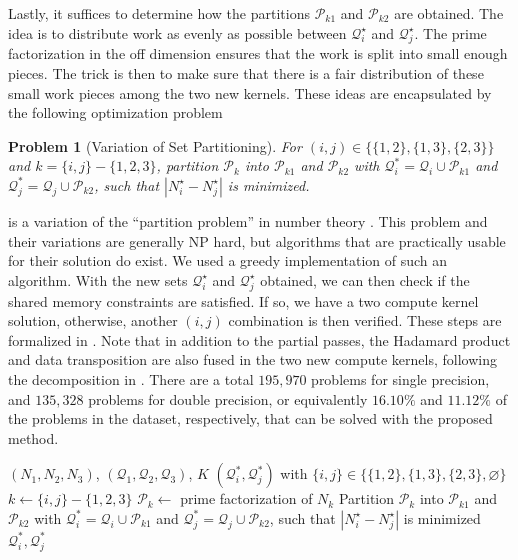 \documentclass[11pt, onecolumn, journal,compsoc]{IEEEtran}
\theoremstyle{problemstyle}
\newtheorem{problem}{Problem}%
\begin{document}
Lastly, it suffices to determine how the partitions $\mathcal{P}_{k1}$ and $\mathcal{P}_{k2}$ are obtained. The idea is to distribute work as evenly as possible between $\mathcal{Q}_i^\star$ and $\mathcal{Q}_j^\star$. The prime factorization in the off dimension ensures that the work is split into small enough pieces. The trick is then to make sure that there is a fair distribution of these small work pieces among the two new kernels. These ideas are encapsulated by the following optimization problem
\begin{problem}[Variation of Set Partitioning]
For $(i,j) \in \bigl \{ \{1,2\}, \{1,3\}, \{2,3\} \bigr \}$ and $k = \{i,j\} - \{1,2,3\}$, partition $\mathcal{P}_k$ into $\mathcal{P}_{k1}$ and $\mathcal{P}_{k2}$ with $\mathcal{Q}_i^* = \mathcal{Q}_i \cup \mathcal{P}_{k1}$ and $\mathcal{Q}_j^* = \mathcal{Q}_j \cup \mathcal{P}_{k2}$, such that $| N_i^\star - N_j^\star |$ is minimized.
\label{prob:set_partitioning}
\end{problem}
 is a variation of the ``partition problem'' in number theory \cite{mertens03}. This problem and their variations are generally NP hard, but algorithms that are practically usable for their solution do exist. We used a greedy implementation of such an algorithm. With the new sets $\mathcal{Q}_i^\star$ and $\mathcal{Q}_j^\star$ obtained, we can then check if the shared memory constraints are satisfied. If so, we have a two compute kernel solution, otherwise, another $(i,j)$ combination is then verified. These steps are formalized in . Note that in addition to the partial passes, the Hadamard product and data transposition are also fused in the two new compute kernels, following the decomposition in . There are a total $195,970$ problems for single precision, and $135,328$ problems for double precision, or equivalently $16.10\%$ and $11.12\%$ of the problems in the dataset, respectively, that can be solved with the proposed method.

\begin{algorithm}
  \begin{algorithmic}[1]
  \Require $(N_1, N_2, N_3)$, $(\mathcal{Q}_1, \mathcal{Q}_2, \mathcal{Q}_3)$, $K$
  \Ensure $(\mathcal{Q}_i^*, \mathcal{Q}_j^*)$ with $\{i,j\} \in \bigl \{ \{1,2\}, \{1,3\}, \{2,3\}, \varnothing \bigr \}$
  \State $k \gets \{i,j\} - \{1,2,3\}$
  \State $\mathcal{P}_k \gets$ prime factorization of $N_k$
  \State Partition $\mathcal{P}_k$ into $\mathcal{P}_{k1}$ and $\mathcal{P}_{k2}$ with $\mathcal{Q}_i^* = \mathcal{Q}_i \cup \mathcal{P}_{k1}$ and $\mathcal{Q}_j^* = \mathcal{Q}_j \cup \mathcal{P}_{k2}$, such that $| N_i^\star - N_j^\star |$ is minimized
   \State \Return $\mathcal{Q}_i^*,\mathcal{Q}_j^*$
  \EndIf
  \EndFor
  \end{algorithmic}
  \caption{Optimal work distribution algorithm}
  \label{alg:optimal_work_distribution}
  \end{algorithm}
\end{document}
